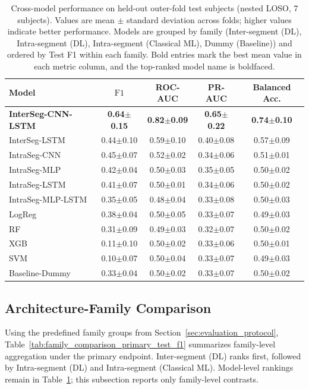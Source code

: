 \begin{table}[!t]
    \centering
    \caption{Cross-model performance on held-out outer-fold test subjects (nested LOSO, 7 subjects). Values are mean $\pm$ standard deviation across folds; higher values indicate better performance. Models are grouped by family (Inter-segment (DL), Intra-segment (DL), Intra-segment (Classical ML), Dummy (Baseline)) and ordered by Test F1 within each family. Bold entries mark the best mean value in each metric column, and the top-ranked model name is boldfaced.}
    \label{tab:model_comparison_primary_test_f1}
\begin{tabular*}{\textwidth}{@{\extracolsep{\fill}}lcccc}
\toprule
Model & $\mathrm{F1}$ & ROC-AUC & PR-AUC & Balanced Acc. \\
\midrule
\textbf{InterSeg-CNN-LSTM} & \textbf{0.64$\pm$0.15} & \textbf{0.82$\pm$0.09} & \textbf{0.65$\pm$0.22} & \textbf{0.74$\pm$0.10} \\
InterSeg-LSTM & 0.44$\pm$0.10 & 0.59$\pm$0.10 & 0.40$\pm$0.08 & 0.57$\pm$0.09 \\
\midrule
IntraSeg-CNN & 0.45$\pm$0.07 & 0.52$\pm$0.02 & 0.34$\pm$0.06 & 0.51$\pm$0.01 \\
IntraSeg-MLP & 0.42$\pm$0.04 & 0.50$\pm$0.03 & 0.35$\pm$0.05 & 0.50$\pm$0.02 \\
IntraSeg-LSTM & 0.41$\pm$0.07 & 0.50$\pm$0.01 & 0.34$\pm$0.06 & 0.50$\pm$0.02 \\
IntraSeg-MLP-LSTM & 0.35$\pm$0.05 & 0.48$\pm$0.04 & 0.33$\pm$0.08 & 0.50$\pm$0.03 \\
\midrule
LogReg & 0.38$\pm$0.04 & 0.50$\pm$0.05 & 0.33$\pm$0.07 & 0.49$\pm$0.03 \\
RF & 0.31$\pm$0.09 & 0.49$\pm$0.03 & 0.32$\pm$0.07 & 0.50$\pm$0.02 \\
XGB & 0.11$\pm$0.10 & 0.50$\pm$0.02 & 0.33$\pm$0.06 & 0.50$\pm$0.01 \\
SVM & 0.10$\pm$0.07 & 0.50$\pm$0.04 & 0.33$\pm$0.07 & 0.49$\pm$0.03 \\
\midrule
Baseline-Dummy & 0.33$\pm$0.04 & 0.50$\pm$0.02 & 0.33$\pm$0.07 & 0.50$\pm$0.02 \\
\bottomrule
\end{tabular*}

\end{table}

\subsection{Architecture-Family Comparison}
\label{sec:architecture_family_comparison}
Using the predefined family groups from Section~\ref{sec:evaluation_protocol}, Table~\ref{tab:family_comparison_primary_test_f1} summarizes family-level aggregation under the primary endpoint. Inter-segment (DL) ranks first, followed by Intra-segment (DL) and Intra-segment (Classical ML). Model-level rankings remain in Table~\ref{tab:model_comparison_primary_test_f1}; this subsection reports only family-level contrasts.

